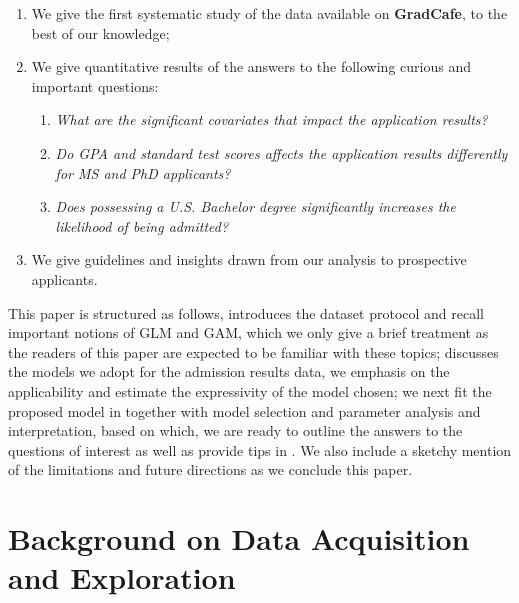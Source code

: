 \documentclass{article}
\newcommand{\noun}[1]{\textbf{#1}}
\begin{document}
\begin{enumerate}
    \item We give the first systematic study of the data available on \noun{GradCafe}, to the
	best of our knowledge;

    \item We give quantitative results of the answers to the following curious and important
	questions:
	    \begin{enumerate}
		\item \emph{What are the significant covariates that impact the application results?}

		\item \emph{Do GPA and standard test scores affects the application results differently for MS
		    and PhD applicants?}

		\item \emph{Does possessing a U.S. Bachelor degree significantly increases the likelihood of being admitted?}
	    \end{enumerate}

    \item We give guidelines and insights drawn from our analysis to prospective applicants.

\end{enumerate}

This paper is structured as follows,  introduces
the dataset protocol and recall important notions of GLM and GAM, which
we only give a brief treatment as the readers of this paper are expected
to be familiar with these topics;  discusses the models
we adopt for the admission results data, we emphasis on the applicability
and estimate the expressivity of the model chosen; we next fit the proposed
model in  together with model selection and parameter analysis
and interpretation, based on which, we are ready to outline the answers to the
questions of interest as well as provide tips in . We also
include a sketchy mention of the limitations and future directions as we
conclude this paper.


\section{Background on Data Acquisition and Exploration} \label{sec:background}
\end{document}
